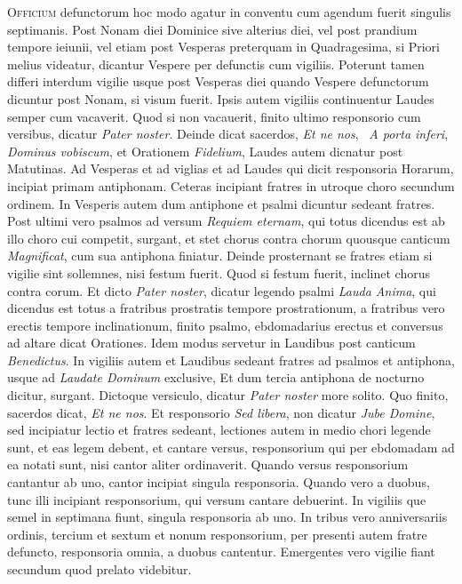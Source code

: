 \begin{multicols*}{2}
{\color{Red} }
\lettrine[lines=2]{\zallmancaps \color{Blue} O}{fficium} defunctorum hoc modo agatur in conventu cum agendum fuerit singulis septimanis. Post Nonam diei Dominice sive alterius diei, vel post prandium tempore ieiunii, vel etiam post Vesperas preterquam in Quadragesima, si Priori melius videatur, dicantur Vespere per defunctis cum vigiliis. Poterunt tamen differi interdum vigilie usque post Vesperas diei quando Vespere defunctorum dicuntur post Nonam, si visum fuerit.
Ipsis autem vigiliis continuentur Laudes semper cum vacaverit.
Quod si non vacauerit, finito ultimo responsorio cum versibus, dicatur \textit{Pater noster}. Deinde dicat sacerdos, \textit{Et ne nos}, \Vbar \ \textit{A porta inferi}, \textit{Dominus vobiscum}, et Orationem \textit{Fidelium}, Laudes autem dicnatur post Matutinas. Ad Vesperas et ad viglias et ad Laudes qui dicit responsoria Horarum, incipiat primam antiphonam. Ceteras incipiant fratres in utroque choro secundum ordinem.
In Vesperis autem dum antiphone et psalmi dicuntur sedeant fratres. Post ultimi vero psalmos ad versum \textit{Requiem eternam}, qui totus dicendus est ab illo choro cui competit, surgant, et stet chorus contra chorum quousque canticum \textit{Magnificat}, cum sua antiphona finiatur.
Deinde prosternant se fratres etiam si vigilie sint sollemnes, nisi festum fuerit. Quod si festum fuerit, inclinet chorus contra corum. Et dicto \textit{Pater noster}, dicatur legendo psalmi \textit{Lauda Anima}, qui dicendus est totus a fratribus prostratis tempore prostrationum, a fratribus vero erectis tempore inclinationum, finito psalmo, ebdomadarius erectus et conversus ad altare dicat Orationes. Idem modus servetur in Laudibus post canticum \textit{Benedictus}.
In vigiliis autem et Laudibus sedeant fratres ad psalmos et antiphona, usque ad \textit{Laudate Dominum} exclusive, Et dum tercia antiphona de nocturno dicitur, surgant. Dictoque versiculo, dicatur \textit{Pater noster} more solito. Quo finito, sacerdos dicat, \textit{Et ne nos}. Et responsorio \textit{Sed libera}, non dicatur \textit{Jube Domine}, sed incipiatur lectio et fratres sedeant, lectiones autem in medio chori legende sunt, et eas legem debent, et cantare versus, responsorium qui per ebdomadam ad ea notati sunt, nisi cantor aliter ordinaverit.
Quando versus responsorium cantantur ab uno, cantor incipiat singula responsoria. Quando vero a duobus, tunc illi incipiant responsorium, qui versum cantare debuerint. In vigiliis que semel in septimana fiunt, singula responsoria ab uno. In tribus vero anniversariis ordinis, tercium et sextum et nonum responsorium, per presenti autem fratre defuncto, responsoria omnia, a duobus cantentur. Emergentes vero vigilie fiant secundum quod prelato videbitur.

\end{multicols*}
